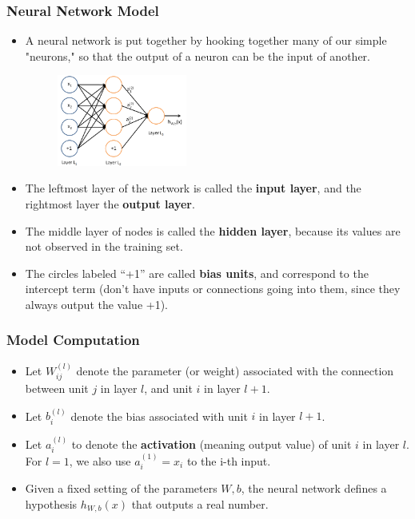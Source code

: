 \documentclass{beamer}
\newcommand{\hide}[1]{} %
\newcommand{\beqn}[1]{\vspace{-0.03in}\begin{eqnarray}#1\end{eqnarray}\vspace{-0.03in}}
\begin{document}
\begin{frame}
\frametitle{Neural Network Model}
\begin{itemize}
\item A neural network is put together by hooking together many of our simple "neurons," so that the output of a neuron can be the input of another. 
\begin{figure}
      \includegraphics[height=3cm]{figs/Network331.png}
\end{figure}

\item The leftmost layer of the network is called the \textbf{input layer}, and the rightmost layer the \textbf{output layer}.
\item The middle layer of nodes is called the \textbf{hidden layer}, because its values are not observed in the training set. 
\item The circles labeled ``+1'' are called \textbf{bias units}, and correspond to the intercept term (don't have inputs or connections going into them, since they always output the value +1).
\end{itemize}
\end{frame}

\begin{frame}
\frametitle{Model Computation}
\begin{itemize}
\item Let $W_{ij}^{(l)}$ denote the parameter (or weight) associated with the connection between unit $j$ in layer $l$, and unit $i$ in layer $l + 1$.
\item Let $b_i^{(l)}$ denote the bias associated with unit $i$ in layer $l + 1$. 
\item Let $a_i^{(l)}$ to denote the \textbf{activation} (meaning output value) of unit $i$ in layer $l$. For $l=1$, we also use $a_i^{(1)}=x_i$ to the i-th input.
\item Given a fixed setting of the parameters $W,b$, the neural network defines a hypothesis $h_{W,b}(x)$ that outputs a real number. 
\hide{
\beqn{
a_1^{(2)} &=& f(W_{11}^{(1)}x_1+W_{12}^{(1)}x_+W_{13}^{(1)}x_3+b_1^{(1)})\\
a_2^{(2)} &=& f(W_{21}^{(1)}x_1+W_{22}^{(1)}x_+W_{23}^{(1)}x_3+b_1^{(1)})\\
a_3^{(2)} &=& f(W_{31}^{(1)}x_1+W_{32}^{(1)}x_+W_{33}^{(1)}x_3+b_1^{(1)})\\
h_{W,b}(x) &=& a_1^{(3)}=f(W_{11}^{(2)}a_1^{(2)}+W_{12}^{(2)}a_2^{(2)}+W_{13}^{(2)}a_3^{(2)}+b_1^{(2)})
}
}
\end{itemize}
\end{frame}
\end{document}
